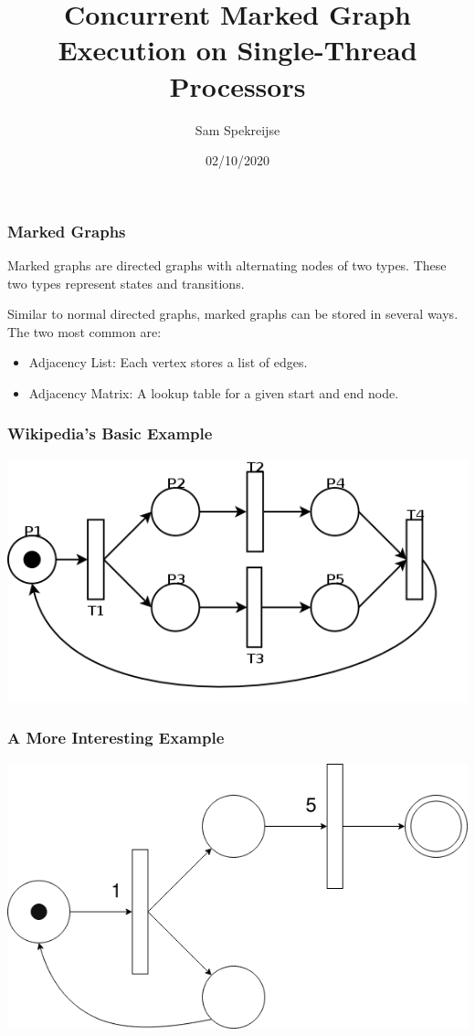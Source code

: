 \documentclass{beamer}
\title{Concurrent Marked Graph Execution on Single-Thread Processors}
\author{Sam Spekreijse}
\date{02/10/2020}
\begin{document}
	\begin{frame}%
	\titlepage
	\end{frame}


	\begin{frame}
	\frametitle{Marked Graphs}
	Marked graphs are directed graphs with alternating nodes of two types. 
	These two types represent states and transitions. 

	\vspace{1cm}

	Similar to normal directed graphs, marked graphs can be stored in several ways. 
	The two most common are:
		\begin{itemize}
		\item Adjacency List: Each vertex stores a list of edges. 
		\item Adjacency Matrix: A lookup table for a given start and end node. 
		\end{itemize}
	\end{frame}


	\begin{frame}
	\frametitle{Wikipedia's Basic Example}
	\includegraphics[width=1.0\textwidth]{Marked_Graph_example1.png}
	\end{frame}


	\begin{frame}
	\frametitle{A More Interesting Example}
	\includegraphics[width=1.0\textwidth]{loop.png}
	\end{frame}
\end{document}
